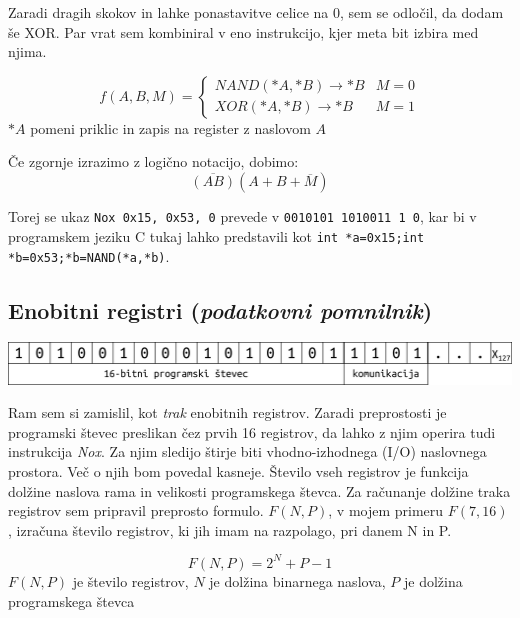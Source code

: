 \documentclass[12pt]{article}
\begin{document}
Zaradi dragih skokov in lahke ponastavitve celice na 0, sem se odločil, da dodam še XOR.\@
Par vrat sem kombiniral v eno instrukcijo, kjer meta bit izbira med njima.

\begin{displaymath}
  f(A,B,M) =
  \begin{cases}
    NAND(*A, *B) \rightarrow *B & M=0\\
    XOR(*A, *B) \rightarrow *B & M=1
  \end{cases}
\end{displaymath}
$*A$ pomeni priklic in zapis na register z naslovom $A$

Če zgornje izrazimo z logično notacijo, dobimo:
\begin{displaymath}
  \overline{(AB)}(A+B+\overline{M})
\end{displaymath}

Torej se ukaz \verb|Nox 0x15, 0x53, 0| prevede v \verb|0010101 1010011 1 0|, kar bi v programskem jeziku C tukaj lahko predstavili kot \verb|int *a=0x15;int *b=0x53;*b=NAND(*a,*b)|.

\pagebreak
\subsection{Enobitni registri (\textit{podatkovni pomnilnik})}

\begin{center}
  \includegraphics[width=\linewidth]{slike/predstavitev/reg.png}
\end{center}

Ram sem si zamislil, kot \textit{trak} enobitnih registrov.
Zaradi preprostosti je programski števec preslikan čez prvih 16 registrov, da lahko z njim operira tudi instrukcija \textit{Nox}.
Za njim sledijo štirje biti vhodno-izhodnega (I/O) naslovnega prostora.
Več o njih bom povedal kasneje.
Število vseh registrov je funkcija dolžine naslova rama in velikosti programskega števca.
Za računanje dolžine traka registrov sem pripravil preprosto formulo.
$F(N,P)$, v mojem primeru $F(7,16)$, izračuna število registrov, ki jih imam na razpolago, pri danem N in P.
\begin{center}
  \begin{displaymath}
    F(N,P)=2^{N}+P-1
  \end{displaymath}
  $F(N,P)$ je število registrov, $N$ je dolžina binarnega naslova, $P$ je dolžina programskega števca
\end{center}
\end{document}
